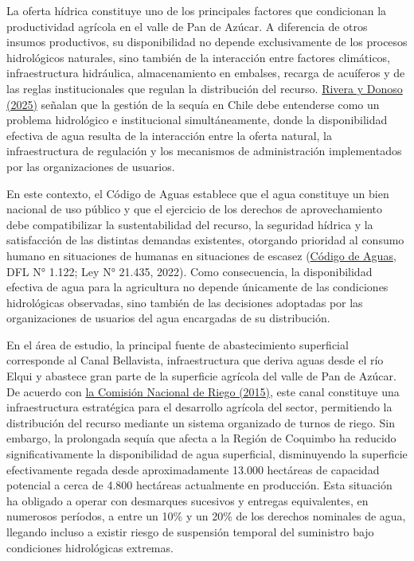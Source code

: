 \documentclass[12pt]{report}
\newcommand{\citeref}[2]{\hyperlink{ref:#1}{#2}}
\begin{document}
La oferta hídrica constituye uno de los principales factores que condicionan la productividad agrícola en el valle de Pan de Azúcar. A diferencia de otros insumos productivos, su disponibilidad no depende exclusivamente de los procesos hidrológicos naturales, sino también de la interacción entre factores climáticos, infraestructura hidráulica, almacenamiento en embalses, recarga de acuíferos y de las reglas institucionales que regulan la distribución del recurso. \citeref{rivera2025}{Rivera y Donoso (2025)} señalan que la gestión de la sequía en Chile debe entenderse como un problema hidrológico e institucional simultáneamente, donde la disponibilidad efectiva de agua resulta de la interacción entre la oferta natural, la infraestructura de regulación y los mecanismos de administración implementados por las organizaciones de usuarios.

En este contexto, el Código de Aguas establece que el agua constituye un bien nacional de uso público y que el ejercicio de los derechos de aprovechamiento debe compatibilizar la sustentabilidad del recurso, la seguridad hídrica y la satisfacción de las distintas demandas existentes, otorgando prioridad al consumo humano en situaciones de humanas en situaciones de escasez (\citeref{codigo1981}{Código de Aguas}, DFL N° 1.122; Ley N° 21.435, 2022). Como consecuencia, la disponibilidad efectiva de agua para la agricultura no depende únicamente de las condiciones hidrológicas observadas, sino también de las decisiones adoptadas por las organizaciones de usuarios del agua encargadas de su distribución.

En el área de estudio, la principal fuente de abastecimiento superficial corresponde al Canal Bellavista, infraestructura que deriva aguas desde el río Elqui y abastece gran parte de la superficie agrícola del valle de Pan de Azúcar. De acuerdo con \citeref{cnr2015}{la Comisión Nacional de Riego (2015)}, este canal constituye una infraestructura estratégica para el desarrollo agrícola del sector, permitiendo la distribución del recurso mediante un sistema organizado de turnos de riego. Sin embargo, la prolongada sequía que afecta a la Región de Coquimbo ha reducido significativamente la disponibilidad de agua superficial, disminuyendo la superficie efectivamente regada desde aproximadamente 13.000 hectáreas de capacidad potencial a cerca de 4.800 hectáreas actualmente en producción. Esta situación ha obligado a operar con desmarques sucesivos y entregas equivalentes, en numerosos períodos, a entre un 10\% y un 20\% de los derechos nominales de agua, llegando incluso a existir riesgo de suspensión temporal del suministro bajo condiciones hidrológicas extremas.
\end{document}
